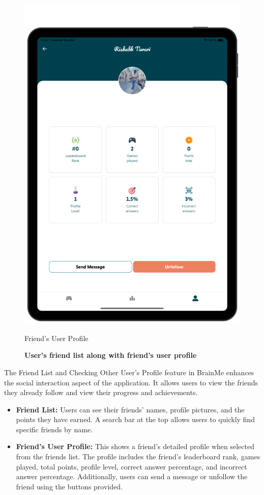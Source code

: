 \begin{figure}[H]
\begin{minipage}[b]{0.43\linewidth}
        \includegraphics[width=\linewidth]{TabletUI/Friend's User Profile.png}
        \caption{Friend's User Profile}
    \end{minipage}
    \vspace{0.5cm}
    \caption{\textbf{User's friend list along with friend's user profile}}
\end{figure}

The Friend List and Checking Other User's Profile feature in BrainMe enhances the social interaction aspect of the application. It allows users to view the friends they already follow and view their progress and achievements.

\begin{itemize}
\item \textbf{Friend List:} Users can see their friends' names, profile pictures, and the points they have earned. A search bar at the top allows users to quickly find specific friends by name.
\item \textbf{Friend's User Profile:} This shows a friend's detailed profile when selected from the friends list. The profile includes the friend's leaderboard rank, games played, total points, profile level, correct answer percentage, and incorrect answer percentage. Additionally, users can send a message or unfollow the friend using the buttons provided.
\end{itemize}

